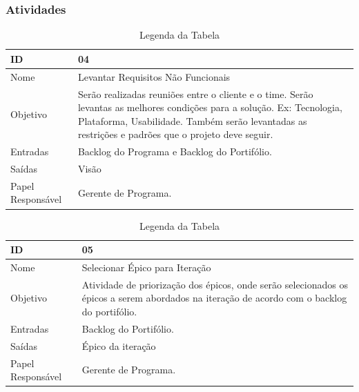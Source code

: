   \subsubsection{Atividades}

  \begin{table}[H]
    \centering
      \begin{tabular}{| m{5em} | m{10cm} |}
        \hline
        ID       & 04   \\ \hline
        Nome     & Levantar Requisitos Não Funcionais   \\ \hline
        Objetivo & Serão realizadas reuniões entre o cliente e o time. Serão levantas as melhores condições para a solução. Ex: Tecnologia, Plataforma, Usabilidade. Também serão levantadas as restrições e padrões que o projeto deve seguir. \\ \hline
        Entradas & Backlog do Programa e Backlog do Portifólio.   \\ \hline
        Saídas   & Visão \\ \hline
        Papel Responsável   & Gerente de Programa. \\ \hline
      \end{tabular}
      \caption{Legenda da Tabela}
      \label{tabela:atividade4}
  \end{table}

  \begin{table}[H]
    \centering
      \begin{tabular}{| m{5em} | m{10cm} |}
        \hline
        ID       & 05   \\ \hline
        Nome     & Selecionar Épico para Iteração   \\ \hline
        Objetivo & Atividade de priorização dos épicos, onde serão selecionados os épicos a serem abordados na iteração de acordo com o backlog do portifólio. \\ \hline
        Entradas & Backlog do Portifólio.\\ \hline
        Saídas   & Épico da iteração \\ \hline
        Papel Responsável   & Gerente de Programa. \\ \hline
      \end{tabular}
      \caption{Legenda da Tabela}
      \label{tabela:atividade5}
  \end{table}

